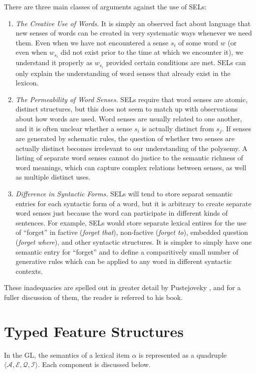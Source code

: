 \documentclass[12pt]{amsart}
\begin{document}
There are three main classes of arguments against the use of SELs:
\begin{enumerate}
\item \emph{The Creative Use of Words.} It is simply an observed fact about language that new senses of words can be created in very systematic ways whenever we need them. Even when we have not encountered a sense $s_i$ of some word $w$ (or even when $w_{s_i}$ did not exist prior to the time at which we encounter it), we understand it properly as $w_{s_i}$ provided certain conditions are met. SELs can only explain the understanding of word senses that already exist in the lexicon.
\item \emph{The Permeability of Word Senses.} SELs require that word senses are atomic, distinct structures, but this does not seem to match up with observations about how words are used. Word senses are usually related to one another, and it is often unclear whether a sense $s_i$ is actually distinct from $s_j$. If senses are generated by schematic rules, the question of whether two senses are actually distinct becomes irrelevant to our understanding of the polysemy. A listing of separate word senses cannot do justice to the semantic richness of word meanings, which can capture complex relations between senses, as well as multiple distinct uses.
\item \emph{Difference in Syntactic Forms.} SELs will tend to store separat semantic entries for each syntactic form of a word, but it is arbitrary to create separate word senses just because the word can participate in different kinds of sentences. For example, SELs would store separate lexical entires for the use of ``forget'' in factive (\emph{forget that}), non-factive (\emph{forget to}), embedded question (\emph{forget where}), and other syntactic structures. It is simpler to simply have one semantic entry for ``forget'' and to define a comparitively small number of generative rules which can be applied to any word in different syntactic contexts.
\end{enumerate}

These inadequacies are spelled out in greater detail by Pustejoveky \cite[Ch. 4]{Pustejovsky95}, and for a fuller discussion of them, the reader is referred to his book.

\section{Typed Feature Structures}

In the GL, the semantics of a lexical item $\alpha$ is represented as a quadruple $\langle \mathcal{A},\mathcal{E},\mathcal{Q},\mathcal{I}\rangle$. Each component is discussed below.
\end{document}

